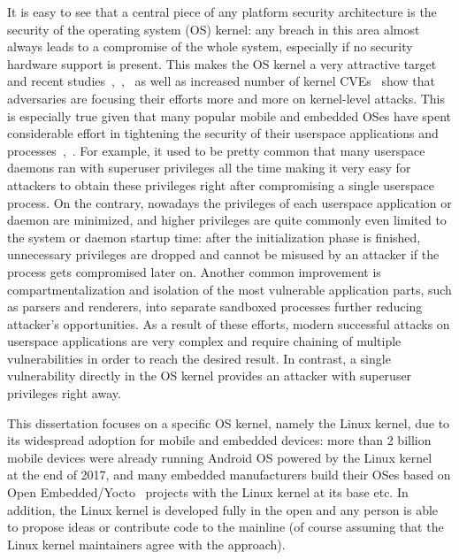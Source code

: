 
It is easy to see that a central piece of any platform security architecture is the security of the operating system (OS) kernel: any breach in this area almost always leads to a compromise of the whole system, especially if no security hardware support is present. This makes the OS kernel a very attractive target and recent studies~\cite{stoep2016android},~\cite{tolvanen2017},~\cite{windowsexploits} as well as increased number of kernel CVEs~\cite{nistCves} show that adversaries are focusing their efforts more and more on kernel-level attacks. This is especially true given that many popular mobile and embedded OSes have spent considerable effort in tightening the security of their userspace applications and processes~\cite{stoep2016android},~\cite{tolvanen2017}. For example, it used to be pretty common that many userspace daemons ran with superuser privileges all the time making it very easy for attackers to obtain these privileges right after compromising a single userspace process. On the contrary, nowadays the privileges of each userspace application or daemon are minimized, and higher privileges are quite commonly even limited to the system or daemon startup time: after the initialization phase is finished, unnecessary privileges are dropped and cannot be misused by an attacker if the process gets compromised later on. Another common improvement is compartmentalization and isolation of the most vulnerable application parts, such as parsers and renderers, into separate sandboxed processes further reducing attacker's opportunities. As a result of these efforts, modern successful attacks on userspace applications are very complex and require chaining of multiple vulnerabilities in order to reach the desired result. In contrast, a single vulnerability directly in the OS kernel provides an attacker with superuser privileges right away.

This dissertation focuses on a specific OS kernel, namely the Linux kernel, due to its widespread adoption for mobile and embedded devices: more than 2 billion mobile devices were already running Android OS powered by the Linux kernel~\cite{googleio2017} at the end of 2017, and many embedded manufacturers build their OSes based on Open Embedded/Yocto~\cite{OE2017, yocto2017} projects with the Linux kernel at its base etc. 
In addition, the Linux kernel is developed fully in the open and any person is able to propose ideas or contribute code to the mainline (of course assuming that the Linux kernel maintainers agree with the approach).


